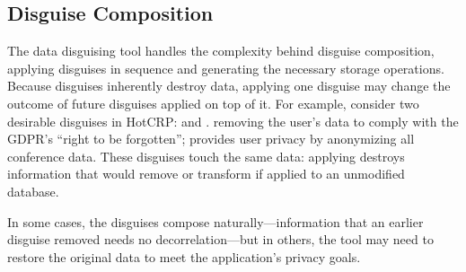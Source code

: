 \fi
\subsection{Disguise Composition}

The data disguising tool handles the complexity behind disguise composition, applying disguises in
sequence and generating the necessary storage operations.
%
%
Because disguises inherently destroy data, applying one disguise may change the outcome of future
disguises applied on top of it.
%
%
For example, consider two desirable disguises in HotCRP: \gdpr and \ca.
%
\gdpr removing the user's data to comply with the GDPR's ``right to be forgotten''; \ca provides
user privacy by anonymizing all conference data.
%
These disguises touch the same data: applying \ca destroys information that \gdpr would remove
or transform if applied to an unmodified database.
%

%
In some cases, the disguises compose naturally---\eg information that an earlier disguise removed
needs no decorrelation---but in others, the tool may need to restore the original data to meet the
application's privacy goals.
%



